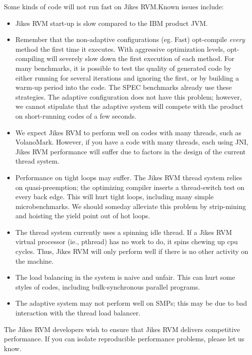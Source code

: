 \T \pagebreak[4]
Some kinds of code will not run fast on Jikes RVM.\@  Known issues include:
\T \nopagebreak
\begin{itemize}
\item Jikes RVM start-up is slow compared to the IBM product JVM.\@
\item Remember that the non-adaptive configurations (eg. Fast) opt-compile
{\em every} method the first time it executes.  With aggressive optimization
levels, opt-compiling will severely slow down the first execution of
each method.  For many benchmarks, it is possible to test the quality
of generated code by either running for several iterations and ignoring
the first, or by building a warm-up period into the code.  The SPEC benchmarks
already use these strategies.  The adaptive configuration does not
have this problem; however, we cannot stipulate that the adaptive
system will compete with the product on short-running codes of a few seconds.
\item We expect Jikes RVM to perform well on codes with many threads, such as
VolanoMark.  However, if you have a code with many threads, each using
JNI, Jikes RVM performance will suffer due to factors in the design of
the current thread system.
\item Performance on tight loops may suffer.  The Jikes RVM thread system
relies on quasi-preemption; the optimizing compiler inserts a thread-switch
test on every back edge.  This will hurt tight loops, including many
simple microbenchmarks.  We should someday alleviate this problem by
strip-mining and hoisting the yield point out of hot loops.
\item The thread system currently uses a spinning idle thread. If a
Jikes RVM
virtual processor (ie., pthread) has no work to do, it spins chewing up
cpu cycles.  Thus, Jikes RVM will only perform well if there is no other activity on the machine.
\item The load balancing in the system is naive and unfair.  This can hurt some styles of codes, including bulk-synchronous parallel programs.
\item The adaptive system may not perform well on SMPs; this may be due to bad
interaction with the thread load balancer.
\end{itemize}

The Jikes RVM developers wish to ensure that Jikes RVM delivers
competitive performance. 
If you can isolate reproducible performance problems, please let us
know. 

